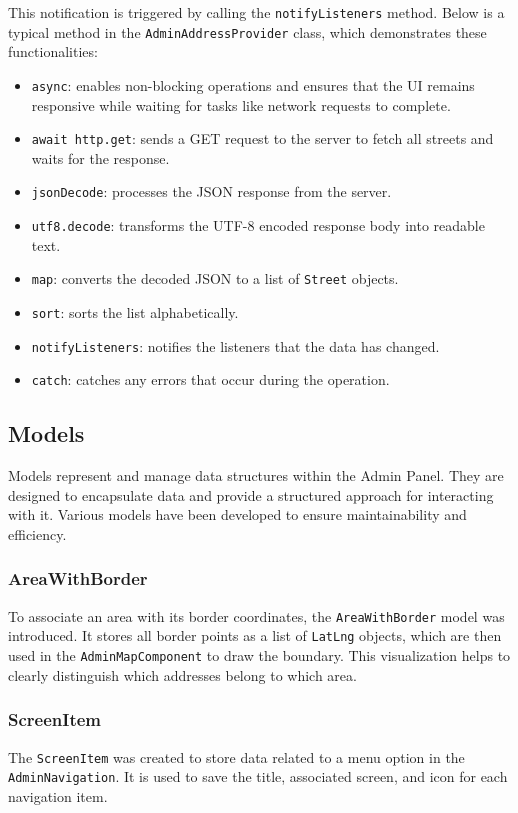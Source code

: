   This notification is triggered by calling the \texttt{notifyListeners} method. Below is a typical method in the \texttt{AdminAddressProvider} class, which demonstrates these functionalities:  
  

\begin{itemize}
    \item \texttt{async}: enables non-blocking operations and ensures that the UI remains responsive while waiting for tasks like network requests to complete.
    \item \texttt{await http.get}: sends a GET request to the server to fetch all streets and waits for the response.
    \item \texttt{jsonDecode}: processes the JSON response from the server.
    \item \texttt{utf8.decode}: transforms the UTF-8 encoded response body into readable text.
    \item \texttt{map}: converts the decoded JSON to a list of \texttt{Street} objects.
    \item \texttt{sort}: sorts the list alphabetically.
    \item \texttt{notifyListeners}: notifies the listeners that the data has changed.
    \item \texttt{catch}: catches any errors that occur during the operation.
\end{itemize}

\subsection{Models}
Models represent and manage data structures within the Admin Panel. They are designed to encapsulate data and provide a structured approach for interacting with it. Various models have been developed to ensure maintainability and efficiency.



\subsubsection{AreaWithBorder}
To associate an area with its border coordinates, the \texttt{AreaWithBorder} model was introduced. It stores all border points as a list of \texttt{LatLng} objects, which are then used in the \texttt{AdminMapComponent} to draw the boundary. This visualization helps to clearly distinguish which addresses belong to which area.\\


\subsubsection{ScreenItem}
\label{fig:ScreenItem}
The \texttt{ScreenItem} was created to store data related to a menu option in the \texttt{AdminNavigation}. It is used to save the title, associated screen, and icon for each navigation item.

